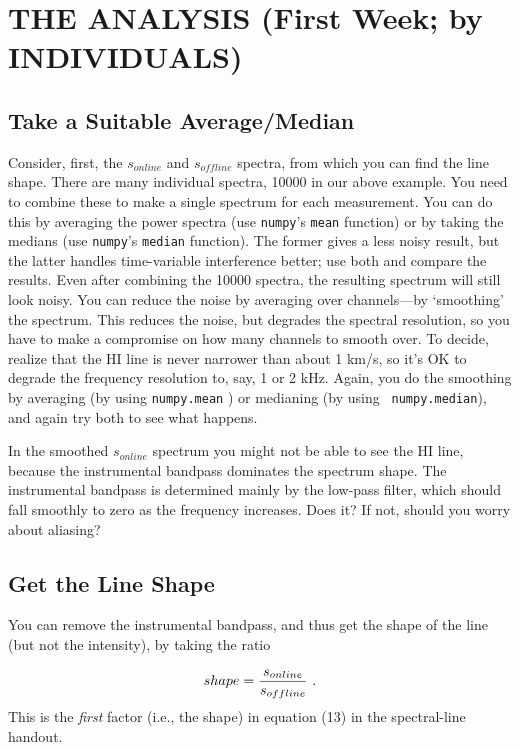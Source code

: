 \documentclass[12pt,preprint]{aastex}
\begin{document}
\section{THE ANALYSIS (First Week; by INDIVIDUALS)} \label{analysis}

\subsection{Take a Suitable Average/Median}
Consider, first, the $s_{online}$ and $s_{offline}$ spectra, from which
you can find the line shape. There are many individual spectra, 10000 in
our above example. You need to combine these to make a single spectrum
for each measurement. You can do this by averaging the power spectra
(use {\tt numpy}'s {\tt mean} function) or by taking the medians (use {\tt numpy}'s
{\tt median} function). The former gives a less noisy result, but the
latter handles time-variable interference better; use both and compare
the results. Even after combining the 10000 spectra, the resulting
spectrum will still look noisy.  You can reduce the noise by averaging
over channels---by `smoothing' the spectrum. This reduces the noise, but
degrades the spectral resolution, so you have to make a compromise on
how many channels to smooth over. To decide, realize that the HI line is
never narrower than about 1 km/s, so it's OK to degrade the frequency
resolution to, say, 1 or 2 kHz. Again, you do the smoothing by averaging
(by using {\tt numpy.mean} ) or medianing (by using {\tt
  numpy.median}), and again try both to see what happens.

In the smoothed $s_{online}$ spectrum you might not be able to see the
HI line, because the instrumental bandpass dominates the spectrum
shape. The instrumental bandpass is determined mainly by the low-pass
filter, which should fall smoothly to zero as the frequency
increases. Does it? If not, should you worry about aliasing?

\subsection{Get the Line Shape}

You can remove the instrumental bandpass, and thus get the shape
of the line (but not the intensity), by taking the ratio 

\begin{equation}
shape = {s_{online} \over s_{offline}} \ .
\end{equation}
%
This is the {\it first} factor (i.e., the shape) in equation
(13) in the spectral-line handout.
%
\end{document}

